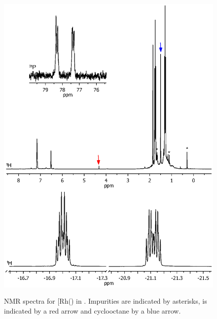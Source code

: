 
\begin{figure}[htbp]
\begin{center}
\vspace{0.5cm}
\includegraphics[trim = 2.5cm 8.5cm 2.5cm 0cm, clip]{../NMR/7006E.eps}
\caption[NMR spectra for \ce{[Rh(\tButhixantphos)Cl(H)2]}]{NMR spectra for \texorpdfstring{[Rh(\tButhixantphos)\ce{Cl(H)2]}} R in .  Impurities are indicated by asterisks,  is indicated by a red arrow and cyclooctane by a blue arrow.}
\vspace{0.2cm}
\label{rhodiumhydridenmr}
\end{center}
\end{figure}
\vspace{0.2cm}

